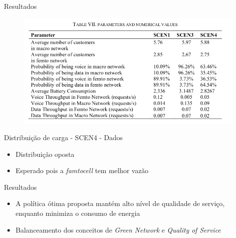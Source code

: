 \begin{frame}{Resultados}
  \begin{figure}[h]
  	\begin{center}
      \includegraphics [scale=0.34]{./Figures/results}
  	\end{center}
  \end{figure}
  \begin{block}{Distribuição de carga - SCEN4 - Dados}
    \begin{itemize}
      \item Distribuição oposta
      \item Esperado pois a \textit{famtocell} tem melhor vazão
    \end{itemize}
  \end{block}
\end{frame}

\begin{frame}{Resultados}
  \begin{block}{}
    \begin{itemize}
      \item A política ótima proposta mantém alto nível de qualidade de
      serviço, enquanto minimiza o consumo de energia
      \item Balanceamento dos conceitos de \textit{Green Network} e
      \textit{Quality of Service}
    \end{itemize}
  \end{block}
\end{frame}


